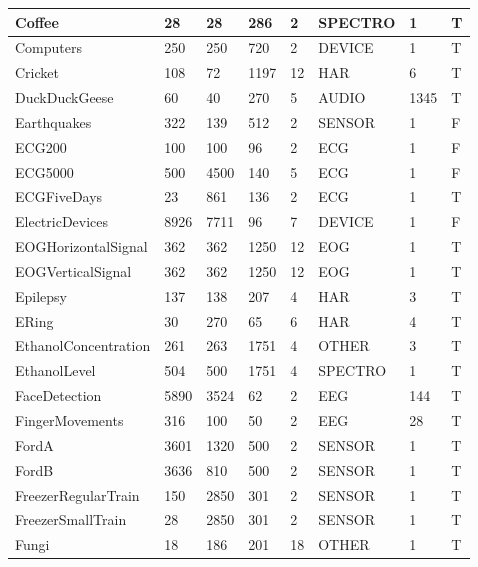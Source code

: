 \begin{landscape}
\begin{longtable}{|*{8}l|}
        \hline
        Coffee & 28 & 28 & 286 & 2 & SPECTRO & 1 & T \\[1ex]
        \hline
        Computers & 250 & 250 & 720 & 2 & DEVICE & 1 & T \\[1ex]
        \hline
        Cricket & 108 & 72 & 1197 & 12 & HAR & 6 & T \\[1ex]
        \hline
        DuckDuckGeese & 60 & 40 & 270 & 5 & AUDIO & 1345 & T \\[1ex]
        \hline
        Earthquakes & 322 & 139 & 512 & 2 & SENSOR & 1 & F \\[1ex]
        \hline
        ECG200 & 100 & 100 & 96 & 2 & ECG & 1 & F \\[1ex]
        \hline
        ECG5000 & 500 & 4500 & 140 & 5 & ECG & 1 & F \\[1ex]
        \hline
        ECGFiveDays & 23 & 861 & 136 & 2 & ECG & 1 & T \\[1ex]
        \hline
        ElectricDevices & 8926 & 7711 & 96 & 7 & DEVICE & 1 & F \\[1ex]
        \hline
        EOGHorizontalSignal & 362 & 362 & 1250 & 12 & EOG & 1 & T \\[1ex]
        \hline
        EOGVerticalSignal & 362 & 362 & 1250 & 12 & EOG & 1 & T \\[1ex]
        \hline
        Epilepsy & 137 & 138 & 207 & 4 & HAR & 3 & T \\[1ex]
        \hline
        ERing & 30 & 270 & 65 & 6 & HAR & 4 & T \\[1ex]
        \hline
        EthanolConcentration & 261 & 263 & 1751 & 4 & OTHER & 3 & T \\[1ex]
        \hline
        EthanolLevel & 504 & 500 & 1751 & 4 & SPECTRO & 1 & T \\[1ex]
        \hline
        FaceDetection & 5890 & 3524 & 62 & 2 & EEG & 144 & T \\[1ex]
        \hline
        FingerMovements & 316 & 100 & 50 & 2 & EEG & 28 & T \\[1ex]
        \hline
        FordA & 3601 & 1320 & 500 & 2 & SENSOR & 1 & T \\[1ex]
        \hline
        FordB & 3636 & 810 & 500 & 2 & SENSOR & 1 & T \\[1ex]
        \hline
        FreezerRegularTrain & 150 & 2850 & 301 & 2 & SENSOR & 1 & T \\[1ex]
        \hline
        FreezerSmallTrain & 28 & 2850 & 301 & 2 & SENSOR & 1 & T \\[1ex]
        \hline
        Fungi & 18 & 186 & 201 & 18 & OTHER & 1 & T \\[1ex]

\end{longtable}
\end{landscape}
